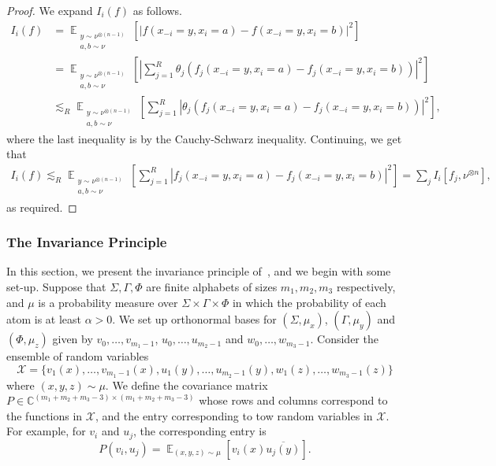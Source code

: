 \documentclass[10pt,a4paper]{amsart}
\newcommand\card[1]{\left| {#1} \right|}
\newcommand\Expect[2]{{\mathop{\mathbb{E}}_{#1}\left[ {#2} \right]}}
\renewcommand\leq{\leqslant}
\newcommand{\V}[1]{{#1}}
\begin{document}
\begin{proof}
We expand $I_i(f)$ as follows.
 \begin{align*}
       I_i(f)&= \Expect{\substack{\V y\sim \nu^{\otimes (n-1)}\\ a, b \sim \nu} }{\card{ f( \V x_{-i} = \V y, x_i = a) - f(\V x_{-i} = \V y, x_i = b) }^2}\\
       & = \Expect{\substack{\V y\sim \nu^{\otimes (n-1)}\\ a, b \sim \nu} }{\card{\sum_{j=1}^R \theta_j (f_j( \V x_{-i} = \V y, x_i = a) - f_j(\V x_{-i} = \V y, x_i = b))}^2}\\
       & \lesssim_R \Expect{\substack{\V y\sim \nu^{\otimes (n-1)}\\ a, b \sim \nu} }{\sum_{j=1}^R \card{\theta_j (f_j( \V x_{-i} = \V y, x_i = a) - f_j(\V x_{-i} = \V y, x_i = b))}^2},
       \end{align*}
       where the last inequality is by the Cauchy-Schwarz inequality. Continuing, we get that
       \begin{align*}
       I_i(f)\lesssim_R 
       \Expect{\substack{\V y\sim \nu^{\otimes (n-1)}\\ a, b \sim \nu} }{\sum_{j=1}^R \card{f_j( \V x_{-i} = \V y, x_i = a) - f_j(\V x_{-i} = \V y, x_i = b)}^2}
          = \sum_{j}I_i[f_j, \nu^{\otimes n}],
   \end{align*}
   as required.
\end{proof}
\subsubsection{The Invariance Principle}\label{sec:invariance_principle}
In this section, we present the invariance principle of~\cite{MOO}, and we begin with some set-up.
Suppose that $\Sigma,\Gamma,\Phi$ are finite alphabets of sizes $m_1,m_2,m_3$ respectively, and
$\mu$ is a probability measure over $\Sigma\times \Gamma\times \Phi$ in which the probability of
each atom is at least $\alpha>0$. We set up orthonormal bases for $(\Sigma,\mu_x)$,
$(\Gamma,\mu_y)$ and $(\Phi,\mu_z)$ given by $v_0,\ldots,v_{m_1-1}$,
$u_0,\ldots,u_{m_2-1}$ and $w_0,\ldots,w_{m_3-1}$. Consider the ensemble of random
variables
\[
\mathcal{X} = \{v_1(x),\ldots,v_{m_1-1}(x),u_1(y),\ldots,u_{m_2-1}(y),w_1(z),\ldots,w_{m_3-1}(z)\}
\]
where $(x,y,z)\sim \mu$. We define the covariance matrix
$P\in\mathbb{C}^{(m_1+m_2+m_3-3)\times(m_1+m_2+m_3-3)}$ whose rows and columns correspond
to the functions in $\mathcal{X}$, and the entry corresponding to tow random variables
in $\mathcal{X}$.
For example, for $v_i$ and $u_j$,
the corresponding entry is
\[
P(v_i,u_j) = \Expect{(x,y,z)\sim \mu}{v_i(x)\overline{u_j(y)}}.
\]
\end{document}
